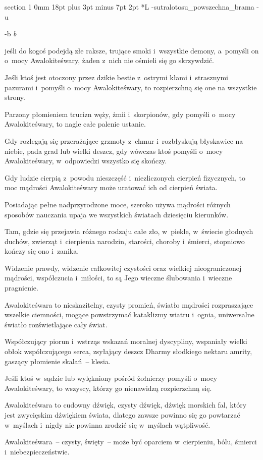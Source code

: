 \documentclass[12pt]{article}
\makeatletter
\renewcommand{\section}{\@startsection%
 {section}			%
 {1}				%
 {0mm}				%
 {18pt plus 3pt minus 7pt}	%
 { 2pt}				%
 {\bfseries}}			%
\newcounter{labelnum}
\newenvironment{Prayer}[4]{%
	\section*{#2}
	\ifx -#1
		\stepcounter{labelnum}\label{label.\arabic{labelnum}}\nopagebreak
	\else
		\label{#1}\nopagebreak
	\fi
	\ifx -#3
		\addcontentsline{toc}{section}{#2}
	\else
		\addcontentsline{toc}{section}{#3}
	\fi
	\ifx -#4
		{}
	\else
		\noindent\emph{#4}\par\nopagebreak
	\fi
	\begingroup
}
{\par\endgroup}
\makeatother
\begin{document}
\begin{Prayer}{sutralotosu_powszechna_brama}
Lub jeśli do kogoś podejdą złe raksze, trujące smoki i~wszystkie demony,
a~pomyśli on o~mocy Awalokiteśwary, żaden z~nich nie ośmieli się go skrzywdzić.


Jeśli ktoś jest otoczony przez dzikie bestie z~ostrymi kłami i~strasznymi
pazurami i~pomyśli o~mocy Awalokiteśwary, to rozpierzchną się one na wszystkie
strony.


Parzony płomieniem trucizn węży, żmii i~skorpionów, gdy pomyśli o~mocy
Awalokiteśwary, to nagle całe palenie ustanie.


Gdy rozlegają się przerażające grzmoty z~chmur i~rozbłyskują błyskawice na
niebie, pada grad lub wielki deszcz, gdy wówczas ktoś pomyśli o~mocy
Awalokiteśwary, w~odpowiedzi wszystko się skończy.


Gdy ludzie cierpią z~powodu nieszczęść i~niezliczonych cierpień fizycznych, to
moc mądrości Awalokiteśwary może uratować ich od cierpień świata.


Posiadając pełne nadprzyrodzone moce, szeroko używa mądrości różnych sposobów
nauczania upaja we wszystkich światach dziesięciu kierunków.


Tam, gdzie się przejawia różnego rodzaju całe zło, w~piekle, w~świecie głodnych
duchów, zwierząt i~cierpienia narodzin, starości, choroby i~śmierci, stopniowo
kończy się ono i~zanika.


Widzenie prawdy, widzenie całkowitej czystości oraz wielkiej nieograniczonej
mądrości, współczucia i~miłości, to są Jego wieczne ślubowania i~wieczne
pragnienie.


Awalokiteśwara to nieskazitelny, czysty promień, światło mądrości rozpraszające
wszelkie ciemności, mogące powstrzymać kataklizmy wiatru i~ognia, uniwersalne
światło rozświetlające cały świat.


Współczujący piorun i~wstrząs wskazań moralnej dyscypliny, wspaniały wielki
obłok współczującego serca, zsyłający deszcz Dharmy słodkiego nektaru amrity,
gaszący płomienie skalań~-- klesia.


Jeśli ktoś w~sądzie lub wylękniony pośród żołnierzy pomyśli o~mocy
Awalokiteśwary, to wszyscy, którzy go nienawidzą rozpierzchną się.


Awalokiteśwara to cudowny dźwięk, czysty dźwięk, dźwięk morskich fal, który
jest zwycięskim dźwiękiem świata, dlatego zawsze powinno się go powtarzać
w~myślach i~nigdy nie powinna zrodzić się w~myślach wątpliwość.


Awalokiteśwara~-- czysty, święty~-- może być oparciem w~cierpieniu, bólu,
śmierci i~niebezpieczeństwie.



\end{Prayer}
\end{document}
